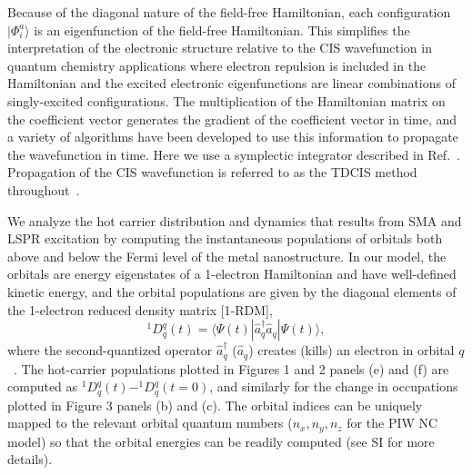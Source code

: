 \documentclass[journal=jpclcd,manuscript=article]{achemso}
\begin{document}
Because of the diagonal nature of the field-free Hamiltonian, each configuration $|\Phi_i^a\rangle$ is an eigenfunction
of the field-free Hamiltonian.  This simplifies the interpretation of the electronic structure relative to the CIS 
wavefunction in quantum chemistry applications where electron repulsion is included in the Hamiltonian
and the excited electronic eigenfunctions are linear combinations of singly-excited configurations. 
The multiplication of the Hamiltonian matrix on the coefficient vector generates the gradient of the coefficient vector in time, and
a variety of algorithms have been developed to use this information to propagate the wavefunction in time.  Here we use a symplectic integrator
described in Ref.~.  Propagation of the CIS wavefunction is referred to as the TDCIS method 
throughout~\cite{KKS_JCP_2005,GHP_PRA_2010,DPG_PRL_2011}.

We analyze the hot carrier distribution and dynamics that results from SMA and LSPR excitation by computing the 
instantaneous populations of orbitals both above and below the Fermi level of the metal nanostructure.   
In our model, the orbitals are energy eigenstates of a 1-electron Hamiltonian and have well-defined kinetic energy,
and the orbital populations are given by the diagonal elements of the 1-electron reduced density matrix [1-RDM],
\begin{equation}
^1D^q_q(t) = \langle \Psi(t) | \hat{a}^{\dagger}_q \hat{a}_q | \Psi(t) \rangle,
\end{equation} 
where the second-quantized operator $\hat{a}_q^{\dagger}$ ($\hat{a}_q$) creates (kills) an electron
in orbital $q$~\cite{Szabo}.  The hot-carrier populations plotted in Figures 1 and 2 panels (e) and (f)
are computed as $^1D^q_q(t)-^1D^q_q(t=0)$, and similarly for the change in occupations plotted
in Figure 3 panels (b) and (c). The orbital indices can be uniquely mapped to the relevant orbital quantum numbers ($n_x, n_y, n_z$ for
the PIW NC model) so that the orbital energies can be readily computed (see SI for more details). 
\end{document}
